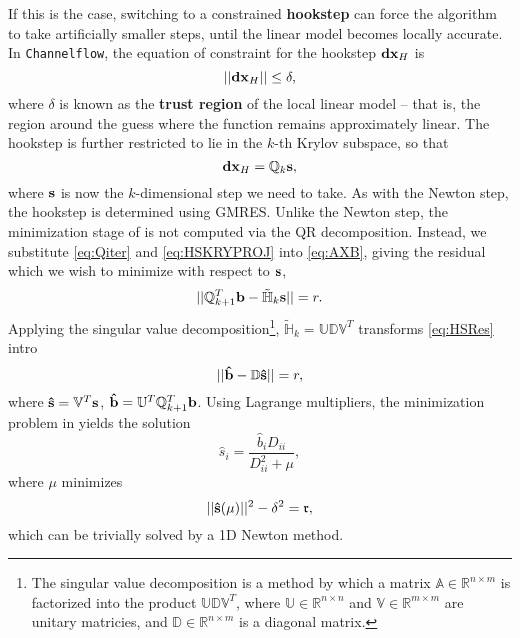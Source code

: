  
 If this is the case, switching to a constrained {\bf hookstep} can force the algorithm to take artificially smaller steps, until the linear model becomes locally accurate. In {\tt Channelflow}, the equation of constraint for the hookstep $\mathbf{dx}_H$ is 
 \begin{equation}\label{eq:HSEOC}
 ||\mathbf{dx}_H|| \leq \delta,
 \end{equation}
 where $\delta$ is known as the {\bf trust region} of the local linear model -- that is, the region around the guess where the function remains approximately linear.  The hookstep is further restricted to lie in the $k$-th Krylov subspace, so that 
 \begin{equation}\label{eq:HSKRYPROJ}
 \mathbf{dx}_H = \mathbb{Q}_{k}\mathbf{s},
 \end{equation} 
 where $\mathbf{s}$ is now the $k$-dimensional step we need to take. As with the Newton step, the hookstep is determined using GMRES. Unlike the Newton step, the minimization stage of  is not computed via the QR decomposition. Instead, we substitute \eqref{eq:Qiter} and \eqref{eq:HSKRYPROJ} into \eqref{eq:AXB}, giving the residual which we wish to minimize with respect to $\mathbf{s}$,
 \begin{equation}\label{eq:HSRes}
 ||\mathbb{Q}^{T}_{k+1}\mathbf{b}-\mathbb{\tilde{H}}_k\mathbf{s}|| = r.
 \end{equation}
 Applying the singular value decomposition\footnote{The singular value decomposition is a method by which a matrix $\mathbb{A} \in \mathbb{R}^{n\times m}$ is factorized into the product $\mathbb{U}\mathbb{D}\mathbb{V}^T$, where $\mathbb{U} \in \mathbb{R}^{n\times n}$ and $\mathbb{V} \in \mathbb{R}^{m\times m}$ are unitary matricies, and $\mathbb{D} \in \mathbb{R}^{n\times m}$ is a diagonal matrix. }, $\mathbb{\tilde{H}}_k = \mathbb{U}\mathbb{D}\mathbb{V}^T$ transforms \eqref{eq:HSRes} intro
 \begin{equation}
 || \mathbf{\hat{b}}-\mathbb{D}\mathbf{\hat{s}} || = r,
 \end{equation}
 where $\mathbf{\hat{s}} = \mathbb{V}^T\mathbf{s}$, $\mathbf{\hat{b}} = \mathbb{U}^T\mathbb{Q}^T_{k+1}\mathbf{b}$. Using Lagrange multipliers, the minimization problem in  yields the solution
 \begin{equation}
 {\hat{s}}_i = \frac{{\hat{b}}_i {D}_{ii}}{{D}_{ii}^2 + \mu},
 \end{equation}
 where $\mu$ minimizes 
 \begin{equation}
 ||\mathbf{\hat{s}}(\mu)||^2 - \delta^2 = \mathfrak{r},
 \end{equation}
 which can be trivially solved by a 1D Newton method. 
 
